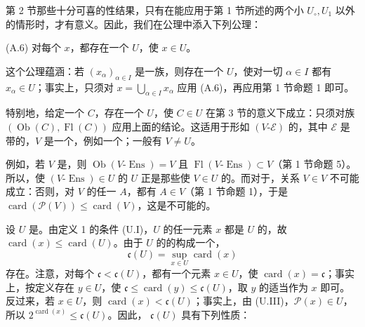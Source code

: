 第 2 节那些十分可喜的性结果，只有在能应用于第 1 节所述的两个小 $U_\circ,U_1$ 以外的情形时，才有意义。因此，我们在公理中添入下列公理：

(A.6) 对每个 $x$，都存在一个 $U$，使 $x\in U$。

这个公理蕴涵：若 $(x_\alpha)_{\alpha\in I}$ 是一族，则存在一个 $U$，使对一切 $\alpha\in I$ 都有 $x_\alpha\in U$；事实上，只须对 $x=\bigcup_{\alpha\in I}x_\alpha$ 应用 (A.6)，再应用第 1 节命题 1 即可。

特别地，给定一个 $C$，存在一个 $U$，使 $C\in U$ 在第 3 节的意义下成立：只须对族 $(\operatorname{Ob}(C),\operatorname{Fl}(C))$ 应用上面的结论。这适用于形如 $(V\text{-}\mathscr E)$ 的，其中 $\mathscr E$ 是带的，$V$ 是一个，例如一个；一般有 $V\ne U$。

例如，若 $V$ 是，则 $\operatorname{Ob}(V\text{-}\operatorname{Ens})=V$ 且 $\operatorname{Fl}(V\text{-}\operatorname{Ens})\subset V$（第 1 节命题 5）。所以，使 $(V\text{-}\operatorname{Ens})\in U$ 的 $U$ 正是那些使 $V\in U$ 的。而对于，关系 $V\in V$ 不可能成立：否则，对 $V$ 的任一 $A$，都有 $A\in V$（第 1 节命题 1），于是 $\operatorname{card}(\mathcal P(V))\leq\operatorname{card}(V)$，这是不可能的。

设 $U$ 是。由定义 1 的条件 (U.I)，$U$ 的任一元素 $x$ 都是 $U$ 的，故 $\operatorname{card}(x)\leq\operatorname{card}(U)$。由于 $U$ 的的构成一个，
\[
 \mathfrak{c}(U)=\sup_{x\in U}\operatorname{card}(x) \tag{1}
\]
存在。注意，对每个 $\mathfrak{c}<\mathfrak{c}(U)$，都有一个元素 $x\in U$，使 $\operatorname{card}(x)=\mathfrak{c}$；事实上，按定义存在 $y\in U$，使 $\mathfrak{c}\leq\operatorname{card}(y)\leq\mathfrak{c}(U)$，取 $y$ 的适当作为 $x$ 即可。反过来，若 $x\in U$，则 $\operatorname{card}(x)<\mathfrak{c}(U)$；事实上，由 (U.III)，$\mathcal P(x)\in U$，所以 $2^{\operatorname{card}(x)}\leq\mathfrak{c}(U)$。因此， $\mathfrak{c}(U)$ 具有下列性质：


